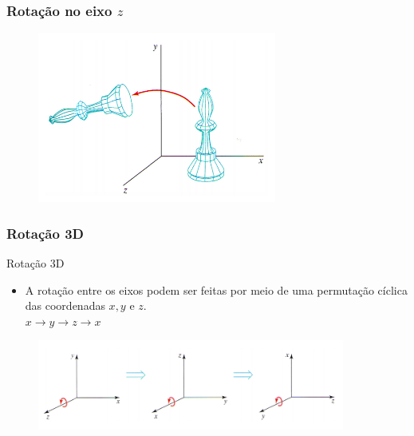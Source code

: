 \documentclass{beamer}
\begin{document}
\begin{frame}
\frametitle{Rotação no eixo $z$}

	\begin{figure}[!h]
			\begin{center}
			\includegraphics[width=0.7\textwidth]{Figures/Rz}
			\end{center}
	\end{figure}
	
\end{frame}


\begin{frame}
\frametitle{Rotação 3D}

	\begin{block}{Rotação 3D}
		\begin{itemize}
			\item A rotação entre os eixos podem ser feitas por meio de uma permutação cíclica das coordenadas $x,y$ e $z$.\\
			$x \to y \to z \to x$
		\end{itemize}
	\end{block}

	\begin{figure}[!h]
			\begin{center}
			\includegraphics[width=0.9\textwidth]{Figures/Rcirc}
			\end{center}
	\end{figure}
	
\end{frame}
\end{document}
